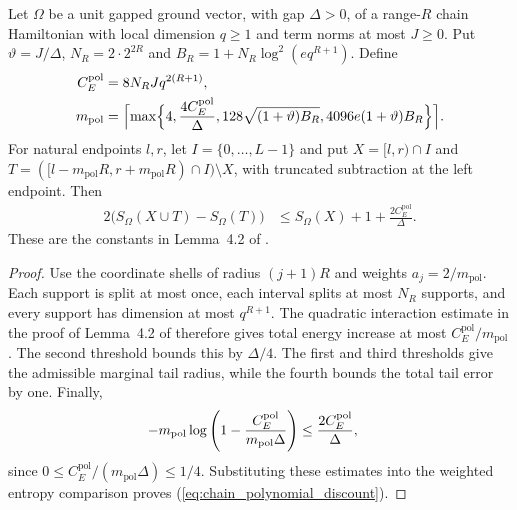 \begin{lemma}
    \label{thm:chain_polynomial_buffer_discount}
    \leanok
    Let $\Omega$ be a unit gapped ground vector, with gap $\Delta>0$,
    of a range-$R$ chain Hamiltonian with local dimension $q\ge1$
    and term norms at most $J\ge0$. Put
    $\vartheta=J/\Delta$, $N_R=2\cdot2^{2R}$ and
    $B_R=1+N_R\log^2(e q^{R+1})$. Define
    \begin{align}
        C_E^{\mathrm{pol}} & =8N_RJq^{2(R+1)},\notag \\
        m_{\mathrm{pol}}   & =\Bigl\lceil\max\Bigl\{
        4,\frac{4C_E^{\mathrm{pol}}}{\Delta},
        128\sqrt{(1+\vartheta)B_R},
        4096e(1+\vartheta)B_R\Bigr\}\Bigr\rceil.
        \label{eq:chain_polynomial_shells}
    \end{align}
    For natural endpoints $l,r$, let $I=\{0,\ldots,L-1\}$ and put
    $X=[l,r)\cap I$ and
    $T=([l-m_{\mathrm{pol}}R,r+m_{\mathrm{pol}}R)\cap I)\setminus X$,
    with truncated subtraction at the left endpoint. Then
    \begin{align}
        2\bigl(S_\Omega(X\cup T)-S_\Omega(T)\bigr)
         & \le S_\Omega(X)+1+\frac{2C_E^{\mathrm{pol}}}{\Delta}.
        \label{eq:chain_polynomial_discount}
    \end{align}
    These are the constants in Lemma~4.2 of
    \cite{TNLean2026OneDimensional}.
    
\end{lemma}
\begin{proof}
    \leanok
    Use the coordinate shells of radius $(j+1)R$ and weights
    $a_j=2/m_{\mathrm{pol}}$. Each support is split at most once,
    each interval splits at most $N_R$ supports, and every support
    has dimension at most $q^{R+1}$. The quadratic interaction
    estimate in the proof of Lemma~4.2 of
    \cite{TNLean2026OneDimensional} therefore gives total energy
    increase at most $C_E^{\mathrm{pol}}/m_{\mathrm{pol}}$.
    The second threshold bounds this by $\Delta/4$.
    The first and third thresholds give the admissible marginal
    tail radius, while the fourth bounds the total tail error by one.
    Finally,
    \begin{align}
        -m_{\mathrm{pol}}\log\left(
        1-\frac{C_E^{\mathrm{pol}}}{m_{\mathrm{pol}}\Delta}\right)
         & \le\frac{2C_E^{\mathrm{pol}}}{\Delta},\notag
    \end{align}
    since $0\le C_E^{\mathrm{pol}}/(m_{\mathrm{pol}}\Delta)\le1/4$.
    Substituting these estimates into the weighted entropy comparison
    proves (\ref{eq:chain_polynomial_discount}).
    
\end{proof}

